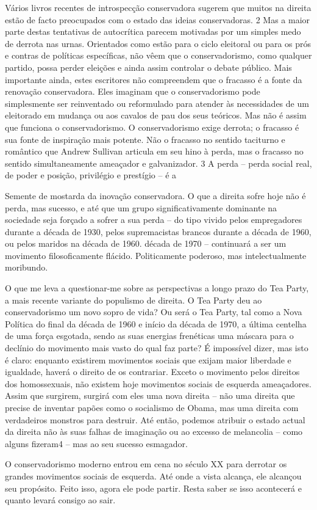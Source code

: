  \par 
Vários livros recentes de introspecção conservadora sugerem que muitos na direita estão de facto preocupados com o estado das ideias conservadoras. {\color{blue}2} Mas a maior parte destas tentativas de autocrítica parecem motivadas por um simples medo de derrota nas urnas. Orientados como estão para o ciclo eleitoral ou para os prós e contras de políticas específicas, não vêem que o conservadorismo, como qualquer partido, possa perder eleições e ainda assim controlar o debate público. Mais importante ainda, estes escritores não compreendem que o fracasso é a fonte da renovação conservadora. Eles imaginam que o conservadorismo pode simplesmente ser reinventado ou reformulado para atender às necessidades de um eleitorado em mudança ou aos cavalos de pau dos seus teóricos. Mas não é assim que funciona o conservadorismo. O conservadorismo exige derrota; o fracasso é sua fonte de inspiração mais potente. Não o fracasso no sentido taciturno e romântico que Andrew Sullivan articula em seu hino à perda, mas o fracasso no sentido simultaneamente ameaçador e galvanizador. {\color{blue}3} A perda – perda social real, de poder e posição, privilégio e prestígio – é a
 \par 
Semente de mostarda da inovação conservadora. O que a direita sofre hoje não é perda, mas sucesso, e até que um grupo significativamente dominante na sociedade seja forçado a sofrer a sua perda – do tipo vivido pelos empregadores durante a década de 1930, pelos supremacistas brancos durante a década de 1960, ou pelos maridos na década de 1960. década de 1970 – continuará a ser um movimento filosoficamente flácido. Politicamente poderoso, mas intelectualmente moribundo.
 \par 
O que me leva a questionar-me sobre as perspectivas a longo prazo do Tea Party, a mais recente variante do populismo de direita. O Tea Party deu ao conservadorismo um novo sopro de vida? Ou será o Tea Party, tal como a Nova Política do final da década de 1960 e início da década de 1970, a última centelha de uma força esgotada, sendo as suas energias frenéticas uma máscara para o declínio do movimento mais vasto do qual faz parte? É impossível dizer, mas isto é claro: enquanto existirem movimentos sociais que exijam maior liberdade e igualdade, haverá o direito de os contrariar. Exceto o movimento pelos direitos dos homossexuais, não existem hoje movimentos sociais de esquerda ameaçadores. Assim que surgirem, surgirá com eles uma nova direita – não uma direita que precise de inventar papões como o socialismo de Obama, mas uma direita com verdadeiros monstros para destruir. Até então, podemos atribuir o estado actual da direita não às suas falhas de imaginação ou ao excesso de melancolia – como alguns fizeram4 – mas ao seu sucesso esmagador.
 \par 
O conservadorismo moderno entrou em cena no século XX para derrotar os grandes movimentos sociais de esquerda. Até onde a vista alcança, ele alcançou seu propósito. Feito isso, agora ele pode partir. Resta saber se isso acontecerá e quanto levará consigo ao sair.